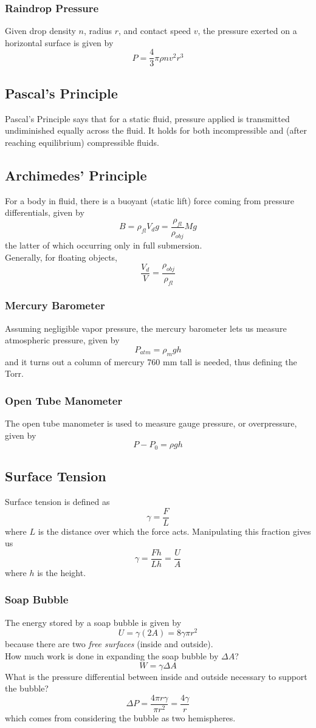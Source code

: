 \documentclass[../PhysicsFormulae.tex]{subfiles}
\begin{document}
\subsubsection{Raindrop Pressure}
Given drop density $n$, radius $r$, and contact speed $v$, the pressure exerted on a horizontal surface is given by
\[ P = \frac{4}{3}\pi \rho nv^2r^3 \]

\subsection{Pascal's Principle}
Pascal's Principle says that for a static fluid, pressure applied is transmitted undiminished equally across the fluid. It holds for both incompressible and (after reaching equilibrium) compressible fluids. 

\subsection{Archimedes' Principle}
For a body in fluid, there is a buoyant (static lift) force coming from pressure differentials, given by
\[ B = \rho_{fl} V_{d} g = \frac{\rho_{fl}}{\rho_{obj}} Mg \]
the latter of which occurring only in full submersion. \\
Generally, for floating objects, 
\[ \frac{V_d}{V} = \frac{\rho_{obj}}{\rho_{fl}} \]

\subsubsection{Mercury Barometer}
Assuming negligible vapor pressure, the mercury barometer lets us measure atmospheric pressure, given by
\[ P_{atm} = \rho_m gh \]
and it turns out a column of mercury 760 mm tall is needed, thus defining the Torr. 

\subsubsection{Open Tube Manometer}
The open tube manometer is used to measure gauge pressure, or overpressure, given by
\[ P - P_0 = \rho g h \]

\subsection{Surface Tension}
Surface tension is defined as 
\[ \gamma = \frac{F}{L} \]
where $L$ is the distance over which the force acts. Manipulating this fraction gives us
\[ \gamma = \frac{Fh}{Lh} = \frac{U}{A} \]
where $h$ is the height. 

\subsubsection{Soap Bubble}
The energy stored by a soap bubble is given by
\[ U = \gamma (2A) = 8\gamma \pi r^2 \]
because there are two \textit{free surfaces} (inside and outside). \\
How much work is done in expanding the soap bubble by $\Delta A$?
\[ W = \gamma \Delta A \]
What is the pressure differential between inside and outside necessary to support the bubble?
\[ \Delta P = \frac{4\pi r \gamma}{\pi r^2} = \frac{4\gamma}{r} \]
which comes from considering the bubble as two hemispheres. 
\end{document}
